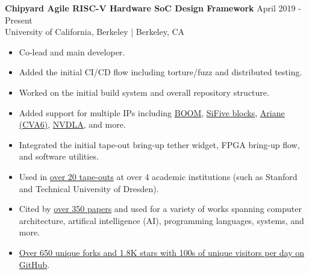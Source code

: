 \documentclass[line]{res}
\begin{document}
\begin{resume}
\label{sec:chipyard}
\textbf{Chipyard Agile RISC-V Hardware SoC Design Framework} \hfill April 2019 - Present
\\
University of California, Berkeley | Berkeley, CA
\\
\vspace{-3mm}
\begin{itemize}
\item Co-lead and main developer.
\item Added the initial CI/CD flow including torture/fuzz and distributed testing.
\item Worked on the initial build system and overall repository structure.
\item Added support for multiple IPs including \hyperref[sec:boom]{BOOM}, \href{https://github.com/chipsalliance/rocket-chip-blocks}{SiFive blocks}, \href{https://github.com/openhwgroup/cva6}{Ariane (CVA6)}, \href{https://nvdla.org/}{NVDLA}, and more.
\item Integrated the initial tape-out bring-up tether widget, FPGA bring-up flow, and software utilities.
\item Used in \href{https://scholar.google.com/scholar?cites=4549882523608568335&as_sdt=2005&sciodt=0,5&hl=en}{over 20 tape-outs} at over 4 academic institutions (such as Stanford and Technical University of Dresden).
\item Cited by \href{https://scholar.google.com/scholar?cites=4549882523608568335&as_sdt=2005&sciodt=0,5&hl=en}{over 350 papers} and used for a variety of works spanning computer architecture, artifical intelligence (AI), programming languages, systems, and more.
\item \href{https://github.com/ucb-bar/chipyard}{Over 650 unique forks and 1.8K stars with 100s of unique visitors per day on GitHub}.
\end{itemize}


\end{resume}
\end{document}
